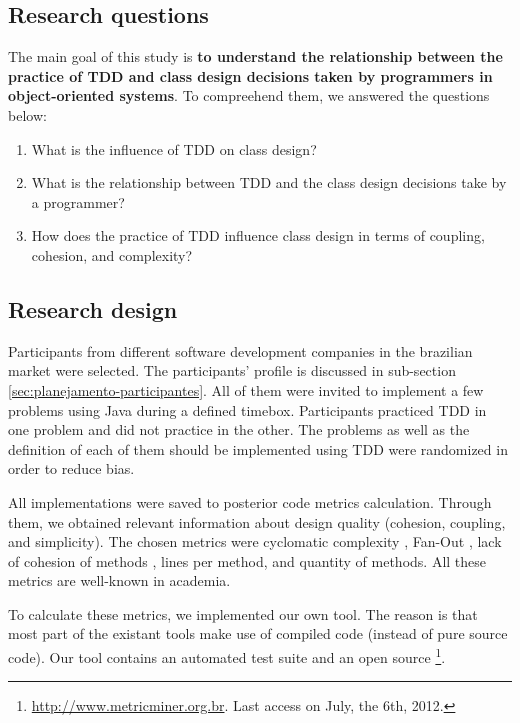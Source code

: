 \documentclass[conference]{IEEEtran}
\begin{document}
\subsection{Research questions}

The main goal of this study is \textbf{to understand the relationship between
the practice of TDD and class design decisions taken by programmers in object-oriented
systems}. To compreehend them, we answered the questions below:

\begin{enumerate}

	\item What is the influence of TDD on class design?

	\item What is the relationship between TDD and the class design decisions take
	by a programmer?

	\item How does the practice of TDD influence class design in terms of coupling, 
	cohesion, and complexity?

\end{enumerate}

\subsection{Research design}

Participants from different software development companies in the brazilian
market were selected. The participants' profile is discussed in sub-section
\ref{sec:planejamento-participantes}. All of them were invited to implement
a few problems using Java during a defined timebox. Participants practiced
TDD in one problem and did not practice in the other. The problems
as well as the definition of each of them should be implemented using TDD were
randomized in order to reduce bias.

All implementations were saved to posterior code metrics calculation.
Through them, we obtained relevant information about design quality (cohesion, 
coupling, and simplicity). The chosen metrics were cyclomatic complexity \cite{mccabe},
Fan-Out \cite{lorenz}, lack of cohesion of methods \cite{lcom-hs}, lines per method,
and quantity of methods. All these metrics are well-known in academia.

To calculate these metrics, we implemented our own tool. The reason is that
most part of the existant tools make use of compiled code (instead of pure source
code). Our tool contains an automated test suite and an open source
\footnote{\url{http://www.metricminer.org.br}. 
Last access on July, the 6th, 2012.}.
\end{document}
